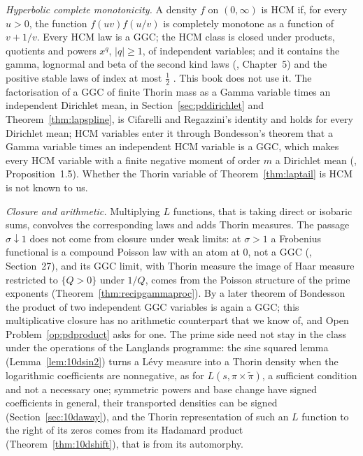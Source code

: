 \emph{Hyperbolic complete monotonicity.} A density $f$ on $(0,\infty)$ is HCM if, for every $u>0$, the function $f(uv)f(u/v)$ is completely monotone as a function of $v+1/v$. Every HCM law is a GGC; the HCM class is closed under products, quotients and powers $x^q$, $|q|\ge1$, of independent variables; and it contains the gamma, lognormal and beta of the second kind laws (\cite{bondesson1992}, Chapter~5) and the positive stable laws of index at most $\frac12$ \cite{boschsimon2016}. This book does not use it. The factorisation of a GGC of finite Thorin mass as a Gamma variable times an independent Dirichlet mean, in Section~\ref{sec:pddirichlet} and Theorem~\ref{thm:lapspline}, is Cifarelli and Regazzini's identity \cite{cifarelliregazzini1990} and holds for every Dirichlet mean; HCM variables enter it through Bondesson's theorem that a Gamma variable times an independent HCM variable is a GGC, which makes every HCM variable with a finite negative moment of order $m$ a Dirichlet mean (\cite{jamesroynetteyor2008}, Proposition~1.5). Whether the Thorin variable of Theorem~\ref{thm:laptail} is HCM is not known to us.

\emph{Closure and arithmetic.} Multiplying $L$ functions, that is taking direct or isobaric sums, convolves the corresponding laws and adds Thorin measures. The passage $\sigma\downarrow1$ does not come from closure under weak limits: at $\sigma>1$ a Frobenius functional is a compound Poisson law with an atom at $0$, not a GGC (\cite{sato1999}, Section~27), and its GGC limit, with Thorin measure the image of Haar measure restricted to $\{Q>0\}$ under $1/Q$, comes from the Poisson structure of the prime exponents (Theorem~\ref{thm:recipgammaproc}). By a later theorem of Bondesson \cite{bondesson2015} the product of two independent GGC variables is again a GGC; this multiplicative closure has no arithmetic counterpart that we know of, and Open Problem~\ref{op:pdproduct} asks for one. The prime side need not stay in the class under the operations of the Langlands programme: the sine squared lemma (Lemma~\ref{lem:10dsin2}) turns a L\'evy measure into a Thorin density when the logarithmic coefficients are nonnegative, as for $L(s,\pi\times\tilde\pi)$, a sufficient condition and not a necessary one; symmetric powers and base change have signed coefficients in general, their transported densities can be signed (Section~\ref{sec:10daway}), and the Thorin representation of such an $L$ function to the right of its zeros comes from its Hadamard product (Theorem~\ref{thm:10dshift}), that is from its automorphy.

